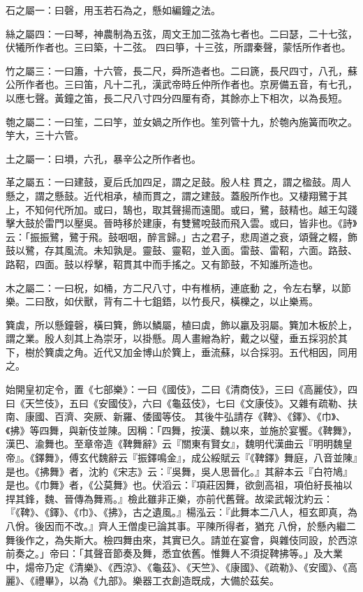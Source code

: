 \begin{pinyinscope}
 石之屬一：曰磬，用玉若石為之，懸如編鐘之法。



 絲之屬四：一曰琴，神農制為五弦，周文王加二弦為七者也。二曰瑟，二十七弦，伏犧所作者也。三曰築，十二弦。
 四曰箏，十三弦，所謂秦聲，蒙恬所作者也。



 竹之屬三：一曰簫，十六管，長二尺，舜所造者也。二曰篪，長尺四寸，八孔，蘇公所作者也。三曰笛，凡十二孔，漢武帝時丘仲所作者也。京房備五音，有七孔，以應七聲。黃鐘之笛，長二尺八寸四分四厘有奇，其餘亦上下相次，以為長短。



 匏之屬二：一曰笙，二曰竽，並女媧之所作也。笙列管十九，於匏內施簧而吹之。竽大，三十六管。



 土之屬一：曰塤，六孔，暴辛公之所作者也。



 革之屬五：一曰建鼓，夏后氏加四足，謂之足鼓。殷人柱
 貫之，謂之楹鼓。周人懸之，謂之懸鼓。近代相承，植而貫之，謂之建鼓。蓋殷所作也。又棲翔鷺于其上，不知何代所加。或曰，鵠也，取其聲揚而遠聞。或曰，鷺，鼓精也。越王勾踐擊大鼓於雷門以壓吳。晉時移於建康，有雙鷺哾鼓而飛入雲。或曰，皆非也。《詩》云：「振振鷺，鷺于飛。鼓咽咽，醉言歸。」古之君子，悲周道之衰，頌聲之輟，飾鼓以鷺，存其風流。未知孰是。靈鼓、靈鞀，並入面。雷鼓、雷鞀，六面。路鼓、路鞀，四面。鼓以桴擊，鞀貫其中而手搖之。又有節鼓，不知誰所造也。



 木之屬二：一曰柷，如桶，方二尺八寸，中有椎柄，連底動
 之，令左右擊，以節樂。二曰敔，如伏獸，背有二十七鉏鋙，以竹長尺，橫櫟之，以止樂焉。



 簨虡，所以懸鐘磬，橫曰簨，飾以鱗屬，植曰虡，飾以臝及羽屬。簨加木板於上，謂之業。殷人刻其上為崇牙，以掛懸。周人畫繒為紵，戴之以璧，垂五採羽於其下，樹於簨虡之角。近代又加金博山於簨上，垂流蘇，以合採羽。五代相因，同用之。



 始開皇初定令，置《七部樂》：一曰《國伎》，二曰《清商伎》，三曰《高麗伎》，四曰《天竺伎》，五曰《安國伎》，六曰《龜茲伎》，七曰《文康伎》。又雜有疏勒、扶南、康國、百濟、突厥、新羅、倭國等伎。
 其後牛弘請存《鞞》、《鐸》、《巾》、《拂》等四舞，與新伎並陳。因稱：「四舞，按漢、魏以來，並施於宴饗。《鞞舞》，漢巴、渝舞也。至章帝造《鞞舞辭》云『關東有賢女』，魏明代漢曲云『明明魏皇帝』。《鐸舞》，傅玄代魏辭云『振鐸鳴金』，成公綏賦云『《鞞鐸》舞庭，八音並陳』是也。《拂舞》者，沈約《宋志》云：『吳舞，吳人思晉化。』其辭本云『白符鳩』是也。《巾舞》者，《公莫舞》也。伏滔云：『項莊因舞，欲劍高祖，項伯紆長袖以捍其鋒，魏、晉傳為舞焉。』檢此雖非正樂，亦前代舊聲。故梁武報沈約云：『《鞞》、《鐸》、《巾》、《拂》，古之遺風。』楊泓云：『此舞本二八人，桓玄即真，為八佾。後因而不改。』齊人王僧虔已論其事。平陳所得者，猶充
 八佾，於懸內繼二舞後作之，為失斯大。檢四舞由來，其實已久。請並在宴會，與雜伎同設，於西涼前奏之。」帝曰：「其聲音節奏及舞，悉宜依舊。惟舞人不須捉鞞拂等。」及大業中，煬帝乃定《清樂》、《西涼》、《龜茲》、《天竺》、《康國》、《疏勒》、《安國》、《高麗》、《禮畢》，以為《九部》。樂器工衣創造既成，大備於茲矣。




\end{pinyinscope}
